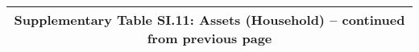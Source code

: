 \begin{longtable}{llcccccccccc}
\multicolumn{12}{c}{{\bfseries Supplementary Table SI.11: Assets (Household) -- continued from previous page}} \\ \hline                                                                                                                                                                                                                                                                                                                                                                                                                                                                                                                                                                                                                                                                                                                                                                  

\end{longtable}
